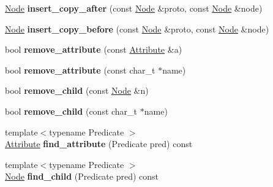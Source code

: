 \begin{DoxyCompactItemize}
\item 
\hypertarget{classphys_1_1xml_1_1Node_a0620e8a5196afc37694f5385e639d006}{
\hyperlink{classphys_1_1xml_1_1Node}{Node} {\bfseries insert\_\-copy\_\-after} (const \hyperlink{classphys_1_1xml_1_1Node}{Node} \&proto, const \hyperlink{classphys_1_1xml_1_1Node}{Node} \&node)}
\label{d7/d0a/classphys_1_1xml_1_1Node_a0620e8a5196afc37694f5385e639d006}

\item 
\hypertarget{classphys_1_1xml_1_1Node_a80828f043fc136104b602126cfc566a5}{
\hyperlink{classphys_1_1xml_1_1Node}{Node} {\bfseries insert\_\-copy\_\-before} (const \hyperlink{classphys_1_1xml_1_1Node}{Node} \&proto, const \hyperlink{classphys_1_1xml_1_1Node}{Node} \&node)}
\label{d7/d0a/classphys_1_1xml_1_1Node_a80828f043fc136104b602126cfc566a5}

\item 
\hypertarget{classphys_1_1xml_1_1Node_a99699d6740844fd73bd4704c954a222d}{
bool {\bfseries remove\_\-attribute} (const \hyperlink{classphys_1_1xml_1_1Attribute}{Attribute} \&a)}
\label{d7/d0a/classphys_1_1xml_1_1Node_a99699d6740844fd73bd4704c954a222d}

\item 
\hypertarget{classphys_1_1xml_1_1Node_a070ffe875695188e68f0554cd2efc2a9}{
bool {\bfseries remove\_\-attribute} (const char\_\-t $\ast$name)}
\label{d7/d0a/classphys_1_1xml_1_1Node_a070ffe875695188e68f0554cd2efc2a9}

\item 
\hypertarget{classphys_1_1xml_1_1Node_a2cf35b26227f6067a25a2ae1647e8f31}{
bool {\bfseries remove\_\-child} (const \hyperlink{classphys_1_1xml_1_1Node}{Node} \&n)}
\label{d7/d0a/classphys_1_1xml_1_1Node_a2cf35b26227f6067a25a2ae1647e8f31}

\item 
\hypertarget{classphys_1_1xml_1_1Node_ab10af5783c31fb58cc533b58a3c11ae0}{
bool {\bfseries remove\_\-child} (const char\_\-t $\ast$name)}
\label{d7/d0a/classphys_1_1xml_1_1Node_ab10af5783c31fb58cc533b58a3c11ae0}

\item 
\hypertarget{classphys_1_1xml_1_1Node_a59e43a51c83065e02fea2f39a37d84f0}{
{\footnotesize template$<$typename Predicate $>$ }\\\hyperlink{classphys_1_1xml_1_1Attribute}{Attribute} {\bfseries find\_\-attribute} (Predicate pred) const }
\label{d7/d0a/classphys_1_1xml_1_1Node_a59e43a51c83065e02fea2f39a37d84f0}

\item 
\hypertarget{classphys_1_1xml_1_1Node_aa46f1a55d5fead8ea4cc68235e45f3fc}{
{\footnotesize template$<$typename Predicate $>$ }\\\hyperlink{classphys_1_1xml_1_1Node}{Node} {\bfseries find\_\-child} (Predicate pred) const }
\label{d7/d0a/classphys_1_1xml_1_1Node_aa46f1a55d5fead8ea4cc68235e45f3fc}


\end{DoxyCompactItemize}
